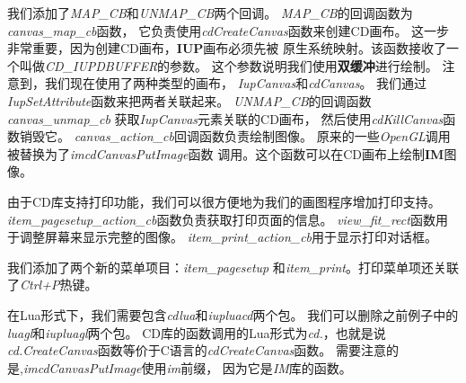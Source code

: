 \documentclass{ctexart}
\begin{document}
我们添加了\emph{MAP\_CB}和\emph{UNMAP\_CB}两个回调。
\emph{MAP\_CB}的回调函数为\emph{canvas\_map\_cb}函数，
它负责使用\emph{cdCreateCanvas}函数来创建CD画布。
这一步非常重要，因为创建CD画布，\textbf{IUP}画布必须先被
原生系统映射。该函数接收了一个叫做\emph{CD\_IUPDBUFFER}的参数。
这个参数说明我们使用\textbf{双缓冲}进行绘制。
注意到，我们现在使用了两种类型的画布，
\emph{IupCanvas}和\emph{cdCanvas}。
我们通过\emph{IupSetAttribute}函数来把两者关联起来。
\emph{UNMAP\_CB}的回调函数\emph{canvas\_unmap\_cb}
获取\emph{IupCanvas}元素关联的CD画布，
然后使用\emph{cdKillCanvas}函数销毁它。
\emph{canvas\_action\_cb}回调函数负责绘制图像。
原来的一些\emph{OpenGL}调用被替换为了\emph{imcdCanvasPutImage}函数
调用。这个函数可以在CD画布上绘制\textbf{IM}图像。

由于CD库支持打印功能，我们可以很方便地为我们的画图程序增加打印支持。
\emph{item\_pagesetup\_action\_cb}函数负责获取打印页面的信息。
\emph{view\_fit\_rect}函数用于调整屏幕来显示完整的图像。
\emph{item\_print\_action\_cb}用于显示打印对话框。

我们添加了两个新的菜单项目：\emph{item\_pagesetup}
和\emph{item\_print}。打印菜单项还关联了\emph{Ctrl+P}热键。

在Lua形式下，我们需要包含\emph{cdlua}和\emph{iupluacd}两个包。
我们可以删除之前例子中的\emph{luagl}和\emph{iupluagl}两个包。
CD库的函数调用的Lua形式为\emph{cd.}，也就是说
\emph{cd.CreateCanvas}函数等价于C语言的\emph{cdCreateCanvas}函数。
需要注意的是,\emph{imcdCanvasPutImage}使用\emph{im}前缀，
因为它是\emph{IM}库的函数。
\end{document}
